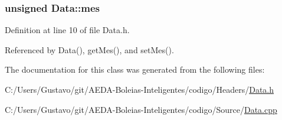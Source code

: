 \hypertarget{class_data_a52f02cba5bf54c79dc1dd93545d27e5f}{
\subsubsection[{mes}]{\setlength{\rightskip}{0pt plus 5cm}unsigned Data\+::mes\hspace{0.3cm}{\ttfamily [protected]}}}\label{class_data_a52f02cba5bf54c79dc1dd93545d27e5f}


Definition at line 10 of file Data.\+h.



Referenced by Data(), get\+Mes(), and set\+Mes().



The documentation for this class was generated from the following files\+:\begin{DoxyCompactItemize}
\item 
C\+:/\+Users/\+Gustavo/git/\+A\+E\+D\+A-\/\+Boleias-\/\+Inteligentes/codigo/\+Headers/\hyperlink{_data_8h}{Data.\+h}\item 
C\+:/\+Users/\+Gustavo/git/\+A\+E\+D\+A-\/\+Boleias-\/\+Inteligentes/codigo/\+Source/\hyperlink{_data_8cpp}{Data.\+cpp}\end{DoxyCompactItemize}
